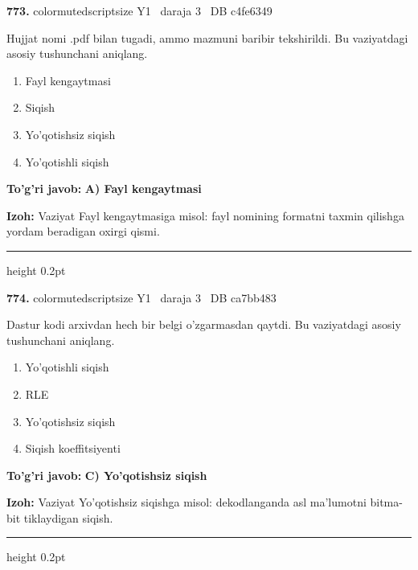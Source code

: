 \documentclass[10pt,a4paper,oneside]{article}
\begin{document}
\noindent\textbf{\color{ink}773.}  {color{muted}scriptsize Y1 \textbullet\ daraja 3 \textbullet\ DB c4fe6349}
\par
Hujjat nomi .pdf bilan tugadi, ammo mazmuni baribir tekshirildi. Bu vaziyatdagi asosiy tushunchani aniqlang.
\begin{enumerate}[label=\Alph*),leftmargin=9mm]
\item Fayl kengaytmasi
\item Siqish
\item Yo'qotishsiz siqish
\item Yo'qotishli siqish
\end{enumerate}
\begin{tcolorbox}[enhanced,breakable,colback=teal!4,colframe=teal!50!black,boxrule=0.5pt,arc=1.1mm,left=3mm,right=3mm,top=1.7mm,bottom=1.7mm,before skip=2mm,after skip=2mm]
\textbf{\color{teal}To'g'ri javob:} \textbf{A) Fayl kengaytmasi}
\par\smallskip
\textbf{Izoh:} Vaziyat Fayl kengaytmasiga misol: fayl nomining formatni taxmin qilishga yordam beradigan oxirgi qismi.
\end{tcolorbox}
\vspace{2mm}\hrule height 0.2pt \vspace{3mm}

\noindent\textbf{\color{ink}774.}  {color{muted}scriptsize Y1 \textbullet\ daraja 3 \textbullet\ DB ca7bb483}
\par
Dastur kodi arxivdan hech bir belgi o'zgarmasdan qaytdi. Bu vaziyatdagi asosiy tushunchani aniqlang.
\begin{enumerate}[label=\Alph*),leftmargin=9mm]
\item Yo'qotishli siqish
\item RLE
\item Yo'qotishsiz siqish
\item Siqish koeffitsiyenti
\end{enumerate}
\begin{tcolorbox}[enhanced,breakable,colback=teal!4,colframe=teal!50!black,boxrule=0.5pt,arc=1.1mm,left=3mm,right=3mm,top=1.7mm,bottom=1.7mm,before skip=2mm,after skip=2mm]
\textbf{\color{teal}To'g'ri javob:} \textbf{C) Yo'qotishsiz siqish}
\par\smallskip
\textbf{Izoh:} Vaziyat Yo'qotishsiz siqishga misol: dekodlanganda asl ma'lumotni bitma-bit tiklaydigan siqish.
\end{tcolorbox}
\vspace{2mm}\hrule height 0.2pt \vspace{3mm}
\end{document}
